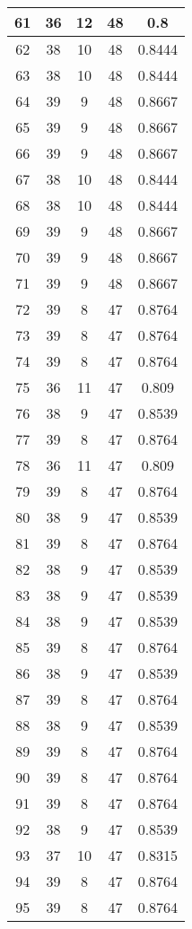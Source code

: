 \documentclass[letterpaper, 12pt]{article}
\begin{document}
\begin{longtable}{|c|c|c|c|c|}
\hline
61 & 36 & 12 & 48 & 0.8 \\
\hline
62 & 38 & 10 & 48 & 0.8444 \\
\hline
63 & 38 & 10 & 48 & 0.8444 \\
\hline
64 & 39 & 9 & 48 & 0.8667 \\
\hline
65 & 39 & 9 & 48 & 0.8667 \\
\hline
66 & 39 & 9 & 48 & 0.8667 \\
\hline
67 & 38 & 10 & 48 & 0.8444 \\
\hline
68 & 38 & 10 & 48 & 0.8444 \\
\hline
69 & 39 & 9 & 48 & 0.8667 \\
\hline
70 & 39 & 9 & 48 & 0.8667 \\
\hline
71 & 39 & 9 & 48 & 0.8667 \\
\hline
72 & 39 & 8 & 47 & 0.8764 \\
\hline
73 & 39 & 8 & 47 & 0.8764 \\
\hline
74 & 39 & 8 & 47 & 0.8764 \\
\hline
75 & 36 & 11 & 47 & 0.809 \\
\hline
76 & 38 & 9 & 47 & 0.8539 \\
\hline
77 & 39 & 8 & 47 & 0.8764 \\
\hline
78 & 36 & 11 & 47 & 0.809 \\
\hline
79 & 39 & 8 & 47 & 0.8764 \\
\hline
80 & 38 & 9 & 47 & 0.8539 \\
\hline
81 & 39 & 8 & 47 & 0.8764 \\
\hline
82 & 38 & 9 & 47 & 0.8539 \\
\hline
83 & 38 & 9 & 47 & 0.8539 \\
\hline
84 & 38 & 9 & 47 & 0.8539 \\
\hline
85 & 39 & 8 & 47 & 0.8764 \\
\hline
86 & 38 & 9 & 47 & 0.8539 \\
\hline
87 & 39 & 8 & 47 & 0.8764 \\
\hline
88 & 38 & 9 & 47 & 0.8539 \\
\hline
89 & 39 & 8 & 47 & 0.8764 \\
\hline
90 & 39 & 8 & 47 & 0.8764 \\
\hline
91 & 39 & 8 & 47 & 0.8764 \\
\hline
92 & 38 & 9 & 47 & 0.8539 \\
\hline
93 & 37 & 10 & 47 & 0.8315 \\
\hline
94 & 39 & 8 & 47 & 0.8764 \\
\hline
95 & 39 & 8 & 47 & 0.8764 \\

\end{longtable}
\end{document}
